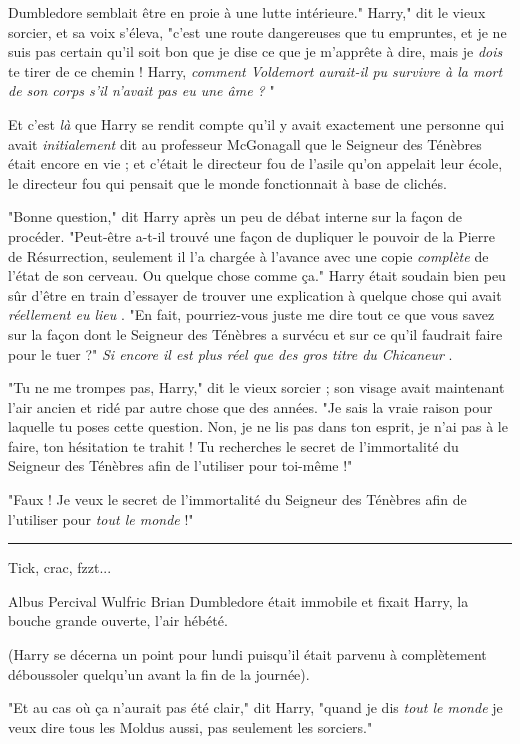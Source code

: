 Dumbledore semblait être en proie à une lutte intérieure." Harry," dit le vieux sorcier, et sa voix s'éleva, "c'est une route dangereuses que tu empruntes, et je ne suis pas certain qu'il soit bon que je dise ce que je m'apprête à dire, mais je \emph{dois}  te tirer de ce chemin ! Harry, \emph{comment Voldemort aurait-il pu survivre à la mort de son corps s'il n'avait pas eu une âme ?} "

Et c'est \emph{là}  que Harry se rendit compte qu'il y avait exactement une personne qui avait \emph{initialement}  dit au professeur McGonagall que le Seigneur des Ténèbres était encore en vie ; et c'était le directeur fou de l'asile qu'on appelait leur école, le directeur fou qui pensait que le monde fonctionnait à base de clichés.

"Bonne question," dit Harry après un peu de débat interne sur la façon de procéder. "Peut-être a-t-il trouvé une façon de dupliquer le pouvoir de la Pierre de Résurrection, seulement il l'a chargée à l'avance avec une copie \emph{complète}  de l'état de son cerveau. Ou quelque chose comme ça." Harry était soudain bien peu sûr d'être en train d'essayer de trouver une explication à quelque chose qui avait \emph{réellement eu lieu} . "En fait, pourriez-vous juste me dire tout ce que vous savez sur la façon dont le Seigneur des Ténèbres a survécu et sur ce qu'il faudrait faire pour le tuer ?" \emph{Si encore il est plus réel que des gros titre du Chicaneur} .

"Tu ne me trompes pas, Harry," dit le vieux sorcier ; son visage avait maintenant l'air ancien et ridé par autre chose que des années. "Je sais la vraie raison pour laquelle tu poses cette question. Non, je ne lis pas dans ton esprit, je n'ai pas à le faire, ton hésitation te trahit ! Tu recherches le secret de l'immortalité du Seigneur des Ténèbres afin de l'utiliser pour toi-même !"

"Faux ! Je veux le secret de l'immortalité du Seigneur des Ténèbres afin de l'utiliser pour \emph{tout le monde}  !"
\par\noindent\rule{\textwidth}{0.4pt}
Tick, crac, fzzt...

Albus Percival Wulfric Brian Dumbledore était immobile et fixait Harry, la bouche grande ouverte, l'air hébété.

(Harry se décerna un point pour lundi puisqu'il était parvenu à complètement déboussoler quelqu'un avant la fin de la journée).

"Et au cas où ça n'aurait pas été clair," dit Harry, "quand je dis \emph{tout le monde}  je veux dire tous les Moldus aussi, pas seulement les sorciers."

